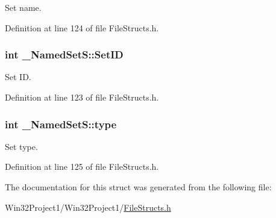 Set name. 



Definition at line 124 of file File\+Structs.\+h.

\subsubsection[{\texorpdfstring{Set\+ID}{SetID}}]{\setlength{\rightskip}{0pt plus 5cm}int \+\_\+\+Named\+Set\+S\+::\+Set\+ID}\hypertarget{struct___named_set_s_a91887154f85a9738aa1d7c313bc3ca3a}{}\label{struct___named_set_s_a91887154f85a9738aa1d7c313bc3ca3a}


Set ID. 



Definition at line 123 of file File\+Structs.\+h.

\subsubsection[{\texorpdfstring{type}{type}}]{\setlength{\rightskip}{0pt plus 5cm}int \+\_\+\+Named\+Set\+S\+::type}\hypertarget{struct___named_set_s_a4f6ea227fa28a50d54f8ae8bca7f6a17}{}\label{struct___named_set_s_a4f6ea227fa28a50d54f8ae8bca7f6a17}


Set type. 



Definition at line 125 of file File\+Structs.\+h.



The documentation for this struct was generated from the following file\+:\begin{DoxyCompactItemize}
\item 
Win32\+Project1/\+Win32\+Project1/\hyperlink{_file_structs_8h}{File\+Structs.\+h}\end{DoxyCompactItemize}

